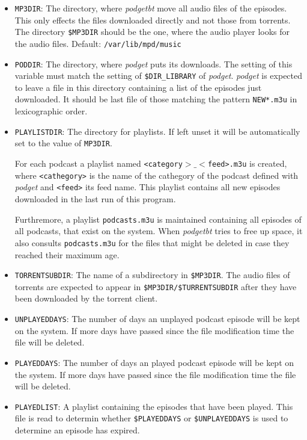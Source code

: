 \begin{itemize}
\item \texttt{MP3DIR}:
  The directory, where \emph{podgetbt} move all audio files of the episodes.
  This only effects the files downloaded directly and not those
  from torrents.
  The directory \texttt{\$MP3DIR} 
  should be the one, where the audio player looks for the audio files.
  Default: \texttt{/var/lib/mpd/music}
\item \texttt{PODDIR}:
  The directory, where \emph{podget}  puts its downloads.
  The setting of this variable must match the setting
  of \texttt{\$DIR\_LIBRARY} of \emph{podget}.
  \emph{podget} is expected to leave a file in this directory
  containing a list of the episodes just downloaded.
  It should be last file of those matching 
  the pattern \texttt{NEW*.m3u} in lexicographic order.
\item \texttt{PLAYLISTDIR}:
  The directory for playlists. If left unset it will be automatically set
  to the value of \texttt{MP3DIR}.

  For each podcast a playlist named 
  \texttt{\textless{}category$>\_<$feed\textgreater{}.m3u}
  is created, where \texttt{\textless{}cathegory\textgreater{}} 
  is the name of the cathegory of
  the podcast defined with \emph{podget} and 
  \texttt{\textless{}feed\textgreater{}} its feed name.
  This playlist contains all new episodes downloaded in the 
  last run of this program.

  Furthremore, a playlist \texttt{podcasts.m3u} is maintained containing all episodes
  of all podcasts, that exist on the system. 
  When \emph{podgetbt} tries to free up space, it also consults
  \texttt{podcasts.m3u} for the files that might be deleted
  in case they reached their maximum age.
\item \texttt{TORRENTSUBDIR}: 
  The name of a subdirectory in \texttt{\$MP3DIR}. The audio files of torrents
  are expected to appear in \texttt{\$MP3DIR/\$TURRENTSUBDIR} after they have
  been downloaded by the torrent client.
\item \texttt{UNPLAYEDDAYS}:
  The number of days an unplayed podcast episode will be kept on the system.
  If more days have passed since the file modification time the file will be 
  deleted.
\item \texttt{PLAYEDDAYS}:
  The number of days an played podcast episode will be kept on the system.
  If more days have passed since the file modification time the file will be 
  deleted.
\item \texttt{PLAYEDLIST}:
  A playlist containing the episodes that have been played.
  This file is read to determin whether \texttt{\$PLAYEDDAYS} or
  \texttt{\$UNPLAYEDDAYS} is used to determine an episode has expired.
  

\end{itemize}

